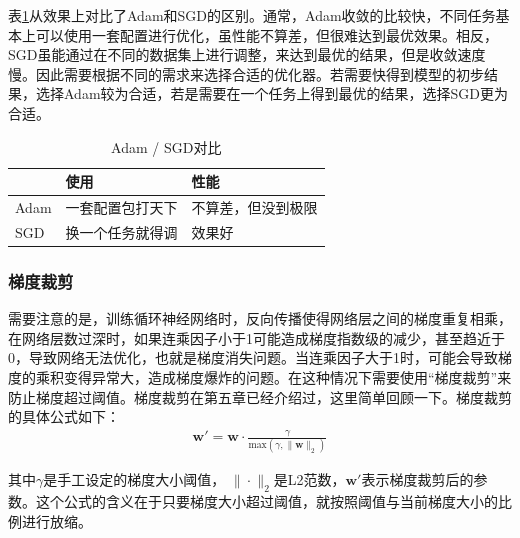 \parinterval 表\ref{tab:6-8}从效果上对比了Adam和SGD的区别。通常，Adam收敛的比较快，不同任务基本上可以使用一套配置进行优化，虽性能不算差，但很难达到最优效果。相反，SGD虽能通过在不同的数据集上进行调整，来达到最优的结果，但是收敛速度慢。因此需要根据不同的需求来选择合适的优化器。若需要快得到模型的初步结果，选择Adam较为合适，若是需要在一个任务上得到最优的结果，选择SGD更为合适。

\vspace{0.5em}
\begin{table}[htp]
\centering
\caption{ Adam / SGD对比}
\label{tab:6-8}
\begin{tabular}{l | l  l }
	 		&使用		&性能 \\ \hline
\rule{0pt}{15pt}	Adam	&一套配置包打天下	&不算差，但没到极限 \\
\rule{0pt}{15pt}	SGD	&换一个任务就得调	&效果好 \\
\end{tabular}
\end{table}


\vspace{-1.5em}
\subsubsection{梯度裁剪}
\vspace{0.5em}

\parinterval 需要注意的是，训练循环神经网络时，反向传播使得网络层之间的梯度重复相乘，在网络层数过深时，如果连乘因子小于1可能造成梯度指数级的减少，甚至趋近于0，导致网络无法优化，也就是梯度消失问题。当连乘因子大于1时，可能会导致梯度的乘积变得异常大，造成梯度爆炸的问题。在这种情况下需要使用``梯度裁剪''来防止梯度超过阈值。梯度裁剪在第五章已经介绍过，这里简单回顾一下。梯度裁剪的具体公式如下：
\begin{eqnarray}
\mathbf{w}' = \mathbf{w} \cdot \frac{\gamma} {\textrm{max}(\gamma,\| \mathbf{w} \|_2)}
\label{eq:6-33}
\end{eqnarray}
\vspace{0.5em}

\noindent 其中$\gamma$是手工设定的梯度大小阈值， $\| \cdot \|_2$是L2范数，$\mathbf{w}'$表示梯度裁剪后的参数。这个公式的含义在于只要梯度大小超过阈值，就按照阈值与当前梯度大小的比例进行放缩。

